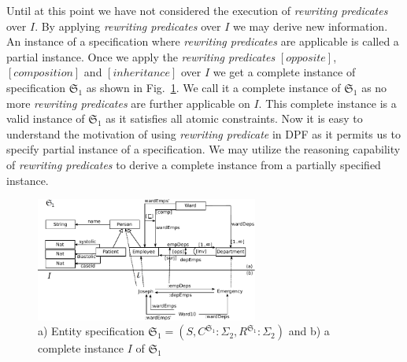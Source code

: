 \documentclass{eceasst}
\begin{document}
Until at this point we have not considered the execution of \textit{rewriting predicates} over $I$. 
By applying \textit{rewriting predicates} over $I$ we may derive new information. 
An instance of a specification where \textit{rewriting predicates} are applicable is called a partial instance. 
Once we apply the \textit{rewriting predicates} $[opposite]$, $[composition]$ and $[inheritance]$ over $I$ we get a complete instance of specification $\mathfrak{S}_1$ as shown in 
Fig.~\ref{fig:entity-1-full}. We call it a complete instance of $\mathfrak{S}_1$ as no more \textit{rewriting predicates} are further applicable on $I$. 
This complete instance is a valid instance of $\mathfrak{S}_1$ as it satisfies all atomic constraints. 
Now it is easy to understand the motivation of using \textit{rewriting predicate} in DPF as it permits us to specify partial instance of a specification. 
We may utilize the reasoning capability of \textit{rewriting predicates} to derive a complete instance from a partially specified instance. 



\begin{figure}[h]
\centering
 \includegraphics[width=0.65\textwidth]{entity-1-full.pdf}
 \caption{ a) Entity specification $\mathfrak{S}_1 = (S, C^{\mathfrak{S}_1} : \Sigma_2,  R^{\mathfrak{S}_1} : \Sigma_2)$ and  b) a complete instance $I$ of $\mathfrak{S}_1$}
 \label{fig:entity-1-full}
 \end{figure}
\end{document}
